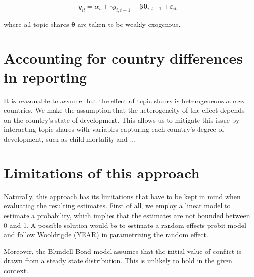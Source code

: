 \begin{equation}
    y_{it} = \alpha_i + \gamma y_{i, t-1} + \mathbf{\beta}\mathbf{\theta}_{i, t-1} + \varepsilon_{it}
\end{equation}

where all topic shares $\mathbf{\theta}$ are taken to be weakly exogenous.

\section{Accounting for country differences in reporting}
It is reasonable to assume that the effect of topic shares is heterogeneous across countries.
We make the assumption that the heterogeneity of the effect depends on the country's state of development.
This allows us to mitigate this issue by interacting topic shares with variables capturing each country's degree of development, such as child mortality and ...

\section{Limitations of this approach}
Naturally, this approach has its limitations that have to be kept in mind when evaluating the resulting estimates.
First of all, we employ a linear model to estimate a probability, which implies that the estimates are not bounded between 0 and 1.
A possible solution would be to estimate a random effects probit model and follow Wooldrigde (YEAR) in parametrizing the random effect.

Moreover, the Blundell Bond model assumes that the initial value of conflict is drawn from a steady state distribution.
This is unlikely to hold in the given context.


\newpage

